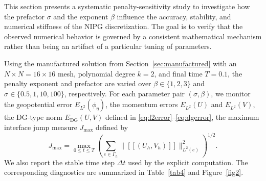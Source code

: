 \documentclass[pdflatex,sn-mathphys-num]{sn-jnl}%
\theoremstyle{thmstyleone}%
\theoremstyle{thmstyletwo}%
\theoremstyle{thmstylethree}%
\begin{document}
This section presents a systematic penalty-sensitivity study to investigate how the prefactor $\sigma$ and the exponent $\beta$ influence the accuracy, stability, and numerical stiffness of the NIPG discretization. The goal is to verify that the observed numerical behavior is governed by a consistent mathematical mechanism rather than being an artifact of a particular tuning of parameters.

Using the manufactured solution from Section~\ref{sec:manufactured} with an $N \times N = 16 \times 16$ mesh, polynomial degree $k=2$, and final time $T=0.1$, the penalty exponent and prefactor are varied over $\beta \in \{1,2,3\}$ and $\sigma \in \{0.5, 1, 10, 100\}$, respectively. For each parameter pair $(\sigma,\beta)$, we monitor the geopotential error $E_{L^2}(\phi_\eta)$, the momentum errors $E_{L^2}(U)$ and $E_{L^2}(V)$, the DG-type norm $E_{\mathrm{DG}}(U,V)$ defined in \eqref{eq:l2error}–\eqref{eq:dgerror}, the maximum interface jump measure $J_{\max}$ defined by
\begin{equation}
\label{eq:jump_max}
J_{\max} = \max_{0\le t\le T} \left( \sum_{e\in\Gamma_h} \|[[ (U_h,V_h) ]]\|_{L^2(e)}^2 \right)^{1/2}.
\end{equation}
We also report the stable time step $\Delta t$ used by the explicit computation. The corresponding diagnostics are summarized in Table~\ref{tab4} and Figure~\ref{fig2}.
\end{document}
